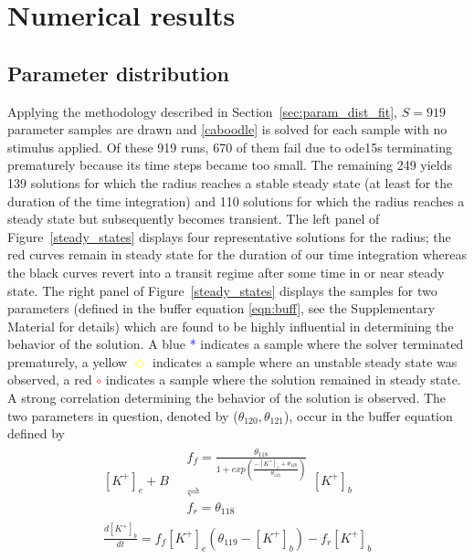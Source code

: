 \section{Numerical results}
\label{sec:results}

\subsection{Parameter distribution}
\label{sec:param_sampling}

Applying the methodology described in Section~\ref{sec:param_dist_fit}, $S=919$ parameter samples are drawn and \eqref{caboodle} is solved for each sample with no stimulus applied. Of these 919 runs, 670 of them fail due to ode15s terminating prematurely because its time steps became too small. The remaining 249 yields 139 solutions for which the radius reaches a stable steady state (at least for the duration of the time integration) and 110 solutions for which the radius reaches a steady state but subsequently becomes transient. The left panel of Figure~\ref{steady_states} displays four representative solutions for the radius; the red curves remain in steady state for the duration of our time integration whereas the black curves revert into a transit regime after some time in or near steady state. The right panel of Figure~\ref{steady_states} displays the samples for two parameters (defined in the buffer equation \eqref{eqn:buff}, see the Supplementary Material for details) which are found to be highly influential in determining the behavior of the solution. A blue \textcolor{blue}{*} indicates a sample where the solver terminated prematurely, a yellow \textcolor{yellow}{$\Diamond$} indicates a sample where an unstable steady state was observed, a red \textcolor{red}{$\circ$} indicates a sample where the solution remained in steady state. A strong correlation determining the behavior of the solution is observed. The two parameters in question, denoted by ($\theta_{120},\theta_{121}$), occur in the buffer equation defined by
\begin{eqnarray}\label{eqn:buff}
[K^+]_e+B \quad\begin{array}{c}
f_f =\frac{\theta_{118}}{1+exp(\frac{-[K^+]_e+\theta_{120}}{\theta_{121}})}\\ 
 \rightleftharpoons \\
f_r=\theta_{118}
\end{array} 
[K^+]_b \nonumber \\
\frac{d[K^+]_b}{dt}=f_f[K^+]_e(\theta_{119}-[K^+]_b)-f_r[K^+]_b \nonumber \\
\end{eqnarray}
